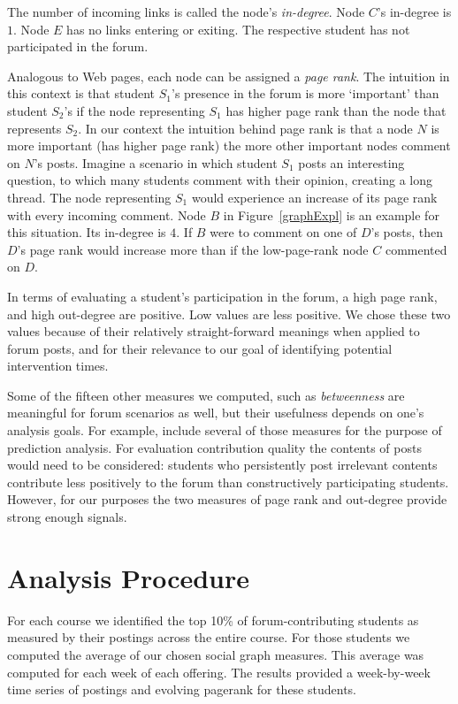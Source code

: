The number of incoming links is called the node's {\em
  in-degree}. Node $C$'s in-degree is $1$. Node $E$ has no links
entering or exiting. The respective student has not participated in
the forum.

Analogous to Web pages, each node can be assigned a {\em page
  rank}. The intuition in this context is that student $S_1$'s
presence in the forum is more `important' than student $S_2$'s if the
node representing $S_1$ has higher page rank than the node that
represents $S_2$. In our context the intuition behind page rank is
that a node $N$ is more important (has higher page rank) the more
other important nodes comment on $N$'s posts. Imagine a scenario
in which student $S_1$ posts an interesting question, to which many
students comment with their opinion, creating a long thread. The node
representing $S_1$ would experience an increase of its page rank with
every incoming comment. Node $B$ in Figure~\ref{graphExpl} is an
example for this situation. Its in-degree is $4$. If $B$ were to
comment on one of $D$'s posts, then $D$'s page rank would increase
more than if the low-page-rank node $C$ commented on $D$.

In terms of evaluating a student's participation in the forum, a high
page rank, and high out-degree are positive. Low values are less
positive. We chose these two values because of their relatively
straight-forward meanings when applied to forum posts, and for their
relevance to our goal of identifying potential intervention times.

Some of the fifteen other measures we computed, such as {\em
  betweenness} are meaningful for forum scenarios as well, but their
usefulness depends on one's analysis goals. For example,
\cite{yang2013} include several of those measures for the purpose of
prediction analysis. For evaluation contribution quality the contents
of posts would need to be considered: students who persistently post
irrelevant contents contribute less positively to the forum than
constructively participating students. However, for our purposes the
two measures of page rank and out-degree provide strong enough
signals.

\section{Analysis Procedure}

For each course we identified the top 10\% of forum-contributing
students as measured by their postings across the entire course. For
those students we computed the average of our chosen social graph
measures. This average was computed for each week of each
offering. The results provided a week-by-week time series of postings
and evolving pagerank for these students.

